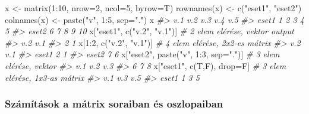 \documentclass[
]{book}
\newenvironment{Shaded}{\begin{snugshade}}{\end{snugshade}}
\newcommand{\AttributeTok}[1]{\textcolor[rgb]{0.77,0.63,0.00}{#1}}
\newcommand{\CommentTok}[1]{\textcolor[rgb]{0.56,0.35,0.01}{\textit{#1}}}
\newcommand{\DecValTok}[1]{\textcolor[rgb]{0.00,0.00,0.81}{#1}}
\newcommand{\FunctionTok}[1]{\textcolor[rgb]{0.00,0.00,0.00}{#1}}
\newcommand{\NormalTok}[1]{#1}
\newcommand{\OtherTok}[1]{\textcolor[rgb]{0.56,0.35,0.01}{#1}}
\newcommand{\SpecialCharTok}[1]{\textcolor[rgb]{0.00,0.00,0.00}{#1}}
\newcommand{\StringTok}[1]{\textcolor[rgb]{0.31,0.60,0.02}{#1}}
\begin{document}
\begin{Shaded}
\begin{Highlighting}[]
\NormalTok{x }\OtherTok{\textless{}{-}} \FunctionTok{matrix}\NormalTok{(}\DecValTok{1}\SpecialCharTok{:}\DecValTok{10}\NormalTok{, }\AttributeTok{nrow=}\DecValTok{2}\NormalTok{, }\AttributeTok{ncol=}\DecValTok{5}\NormalTok{, }\AttributeTok{byrow=}\NormalTok{T)}
\FunctionTok{rownames}\NormalTok{(x) }\OtherTok{\textless{}{-}} \FunctionTok{c}\NormalTok{(}\StringTok{"eset1"}\NormalTok{, }\StringTok{"eset2"}\NormalTok{)}
\FunctionTok{colnames}\NormalTok{(x) }\OtherTok{\textless{}{-}} \FunctionTok{paste}\NormalTok{(}\StringTok{"v"}\NormalTok{, }\DecValTok{1}\SpecialCharTok{:}\DecValTok{5}\NormalTok{, }\AttributeTok{sep=}\StringTok{"."}\NormalTok{)}
\NormalTok{x}
\CommentTok{\#\textgreater{}       v.1 v.2 v.3 v.4 v.5}
\CommentTok{\#\textgreater{} eset1   1   2   3   4   5}
\CommentTok{\#\textgreater{} eset2   6   7   8   9  10}
\NormalTok{x[}\StringTok{"eset1"}\NormalTok{, }\FunctionTok{c}\NormalTok{(}\StringTok{"v.2"}\NormalTok{, }\StringTok{"v.1"}\NormalTok{)]           }\CommentTok{\# 2 elem elérése, vektor output}
\CommentTok{\#\textgreater{} v.2 v.1 }
\CommentTok{\#\textgreater{}   2   1}
\NormalTok{x[}\DecValTok{1}\SpecialCharTok{:}\DecValTok{2}\NormalTok{, }\FunctionTok{c}\NormalTok{(}\StringTok{"v.2"}\NormalTok{, }\StringTok{"v.1"}\NormalTok{)]               }\CommentTok{\# 4 elem elérése, 2x2{-}es mátrix}
\CommentTok{\#\textgreater{}       v.2 v.1}
\CommentTok{\#\textgreater{} eset1   2   1}
\CommentTok{\#\textgreater{} eset2   7   6}
\NormalTok{x[}\StringTok{"eset2"}\NormalTok{, }\FunctionTok{paste}\NormalTok{(}\StringTok{"v"}\NormalTok{, }\DecValTok{1}\SpecialCharTok{:}\DecValTok{3}\NormalTok{, }\AttributeTok{sep=}\StringTok{"."}\NormalTok{)]  }\CommentTok{\# 3 elem elérése, vektor}
\CommentTok{\#\textgreater{} v.1 v.2 v.3 }
\CommentTok{\#\textgreater{}   6   7   8}
\NormalTok{x[}\StringTok{"eset1"}\NormalTok{, }\FunctionTok{c}\NormalTok{(T,F), drop}\OtherTok{=}\NormalTok{F]            }\CommentTok{\# 3 elem elérése, 1x3{-}as mátrix}
\CommentTok{\#\textgreater{}       v.1 v.3 v.5}
\CommentTok{\#\textgreater{} eset1   1   3   5}
\end{Highlighting}
\end{Shaded}

\hypertarget{szuxe1muxedtuxe1sok-a-muxe1trix-soraiban-uxe9s-oszlopaiban}{%
\subsubsection{Számítások a mátrix soraiban és oszlopaiban}\label{szuxe1muxedtuxe1sok-a-muxe1trix-soraiban-uxe9s-oszlopaiban}}
\end{document}
